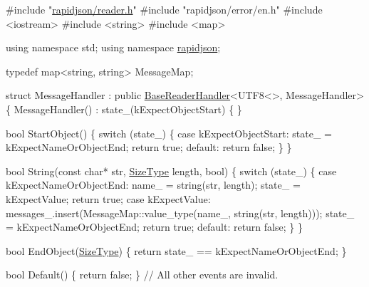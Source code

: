 \begin{DoxyCode}
\textcolor{preprocessor}{#include "\hyperlink{reader_8h}{rapidjson/reader.h}"}
\textcolor{preprocessor}{#include "rapidjson/error/en.h"}
\textcolor{preprocessor}{#include <iostream>}
\textcolor{preprocessor}{#include <string>}
\textcolor{preprocessor}{#include <map>}

\textcolor{keyword}{using namespace }std;
\textcolor{keyword}{using namespace }\hyperlink{namespacerapidjson}{rapidjson};

\textcolor{keyword}{typedef} map<string, string> MessageMap;

\textcolor{keyword}{struct }MessageHandler
    : \textcolor{keyword}{public} \hyperlink{struct_base_reader_handler}{BaseReaderHandler}<UTF8<>, MessageHandler> \{
    MessageHandler() : state\_(kExpectObjectStart) \{
    \}

    \textcolor{keywordtype}{bool} StartObject() \{
        \textcolor{keywordflow}{switch} (state\_) \{
        \textcolor{keywordflow}{case} kExpectObjectStart:
            state\_ = kExpectNameOrObjectEnd;
            \textcolor{keywordflow}{return} \textcolor{keyword}{true};
        \textcolor{keywordflow}{default}:
            \textcolor{keywordflow}{return} \textcolor{keyword}{false};
        \}
    \}

    \textcolor{keywordtype}{bool} String(\textcolor{keyword}{const} \textcolor{keywordtype}{char}* str, \hyperlink{rapidjson_8h_a5ed6e6e67250fadbd041127e6386dcb5}{SizeType} length, \textcolor{keywordtype}{bool}) \{
        \textcolor{keywordflow}{switch} (state\_) \{
        \textcolor{keywordflow}{case} kExpectNameOrObjectEnd:
            name\_ = string(str, length);
            state\_ = kExpectValue;
            \textcolor{keywordflow}{return} \textcolor{keyword}{true};
        \textcolor{keywordflow}{case} kExpectValue:
            messages\_.insert(MessageMap::value\_type(name\_, \textcolor{keywordtype}{string}(str, length)));
            state\_ = kExpectNameOrObjectEnd;
            \textcolor{keywordflow}{return} \textcolor{keyword}{true};
        \textcolor{keywordflow}{default}:
            \textcolor{keywordflow}{return} \textcolor{keyword}{false};
        \}
    \}

    \textcolor{keywordtype}{bool} EndObject(\hyperlink{rapidjson_8h_a5ed6e6e67250fadbd041127e6386dcb5}{SizeType}) \{ \textcolor{keywordflow}{return} state\_ == kExpectNameOrObjectEnd; \}

    \textcolor{keywordtype}{bool} Default() \{ \textcolor{keywordflow}{return} \textcolor{keyword}{false}; \} \textcolor{comment}{// All other events are invalid.}


\end{DoxyCode}
